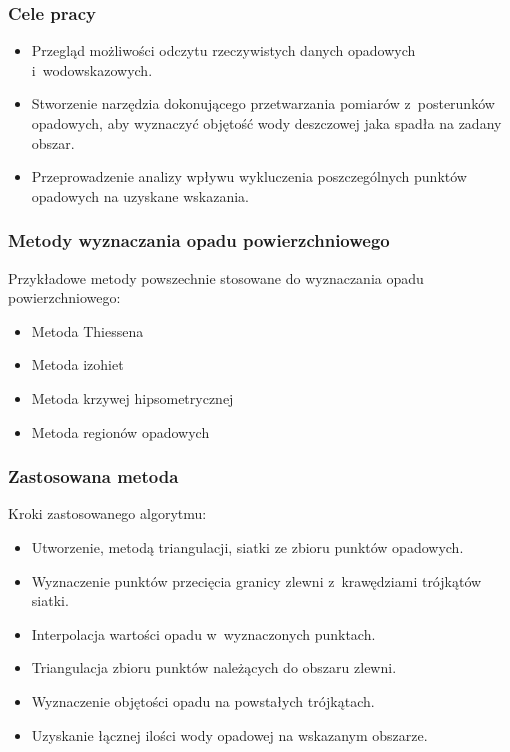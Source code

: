 \documentclass{beamer}
\begin{document}
\begin{frame}
\frametitle{Cele pracy}
\begin{itemize}
\item{Przegląd możliwości odczytu rzeczywistych danych opadowych i~wodowskazowych.}

\item{Stworzenie narzędzia dokonującego przetwarzania pomiarów z~posterunków opadowych, aby wyznaczyć objętość wody deszczowej jaka spadła na zadany obszar.}

\item{Przeprowadzenie analizy wpływu wykluczenia poszczególnych punktów opadowych na uzyskane wskazania.}


\end{itemize}
\end{frame}
\begin{frame}
\frametitle{Metody wyznaczania opadu powierzchniowego}

Przykładowe metody powszechnie stosowane do wyznaczania opadu powierzchniowego:
\begin{itemize}
\item{Metoda Thiessena}
\item{Metoda izohiet}
\item{Metoda krzywej hipsometrycznej}
\item{Metoda regionów opadowych}
\end{itemize}

\end{frame}

\begin{frame}
\frametitle{Zastosowana metoda}

Kroki zastosowanego algorytmu:
\begin{itemize}
	\item{Utworzenie, metodą triangulacji, siatki ze zbioru punktów opadowych.}
	\item{Wyznaczenie punktów przecięcia granicy zlewni z~krawędziami trójkątów siatki.}	
	\item{Interpolacja wartości opadu w~wyznaczonych punktach.}
	\item{Triangulacja zbioru punktów należących do obszaru zlewni.}
	\item{Wyznaczenie objętości opadu na powstałych trójkątach.}
	\item{Uzyskanie łącznej ilości wody opadowej na wskazanym obszarze.}
\end{itemize}
\end{frame}
\end{document}
